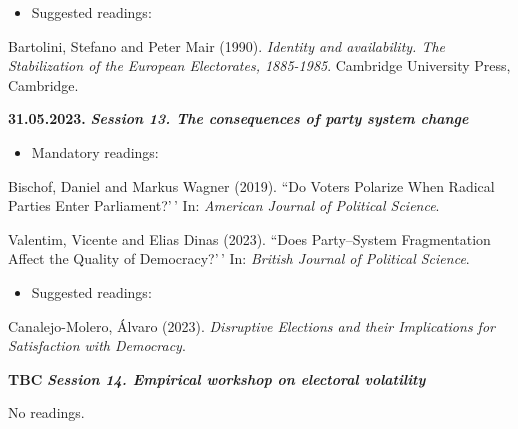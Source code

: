 \documentclass[
  12pt,
]{article}
\providecommand{\tightlist}{%
  \setlength{\itemsep}{0pt}\setlength{\parskip}{0pt}}
\begin{document}
\begin{itemize}
\tightlist
\item
  Suggested readings:
\end{itemize}

Bartolini, Stefano and Peter Mair (1990).
\emph{Identity and availability. The Stabilization of the European Electorates, 1885-1985}.
Cambridge University Press, Cambridge.

\textbf{31.05.2023.} \textbf{\emph{Session 13. The consequences of party
system change}}

\begin{itemize}
\tightlist
\item
  Mandatory readings:
\end{itemize}

Bischof, Daniel and Markus Wagner (2019). ``Do Voters Polarize When
Radical Parties Enter Parliament?'\,' In:
\emph{American Journal of Political Science}.

Valentim, Vicente and Elias Dinas (2023). ``Does Party--System
Fragmentation Affect the Quality of Democracy?'\,' In:
\emph{British Journal of Political Science}.

\begin{itemize}
\tightlist
\item
  Suggested readings:
\end{itemize}

Canalejo-Molero, Álvaro (2023).
\emph{Disruptive Elections and their Implications for Satisfaction with Democracy}.

\textbf{TBC} \textbf{\emph{Session 14. Empirical workshop on electoral
volatility}}

No readings.
\end{document}
